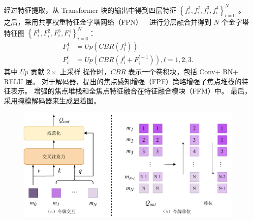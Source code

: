 经过特征提取，从 Transformer 块的输出中得到四层特征 
$\left \{ f_{i}^{1},f_{i}^{2},f_{i}^{3},f_{i}^{4} \right \}_{i=0}^{N}$ 。 
之后，采用共享权重特征金字塔网络（FPN）~\cite{lin2017feature}~进行分层融合并得到 $N$ 个金字塔特征图	$ \left \{F_{i}^{1},F_{i}^{2},F_{i}^{3},F_{i}^{4} \right \}_{i=0}^{N}$：
\begin{equation}
	\begin{aligned}
		F_{i}^{4} &= Up \left ( CBR \left ( f_{i}^{4} \right )\right ) \\ 
		F_{i}^{l} &= Up \left ( CBR \left ( f_{i}^{l} + F_{i}^{l+1} \right )  \right ),l=1,2,3  .
	\end{aligned}
\end{equation}
其中 $Up$ 贡献 $2 \times $ 上采样 操作时，$CBR$ 表示一个卷积块，包括 Conv+ BN+ RELU 层。 对于解码器，提出的焦点感知增强（FPE）策略增强了焦点堆栈的特征表示。 增强的焦点堆栈和全焦点特征融合在特征融合模块（FFM）中。 最后，采用掩模解码器来生成显着图。




















\begin{figure}[!ht]
	\centering
	\includegraphics[width=0.95\linewidth]{figures/chapter3/token-interaction.drawio}
	\label{cpt3_fig1:token_interaction}
\end{figure}




